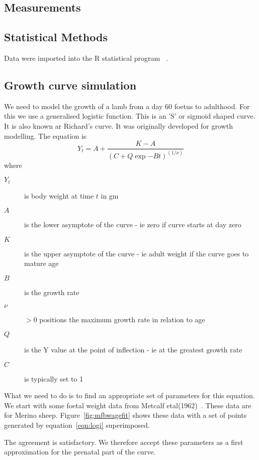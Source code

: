 \documentclass[titlepage]{article}  %
\begin{document}
\subsection{Measurements}


\subsection{Statistical Methods}
Data were imported into the R statistical program~\cite{rprog:13} .

\subsection{Growth curve simulation}
\label{sec:growth}
We need to model the growth of a lamb from a day 60 foetus to adulthood. 
For this we use a generalised logistic function. This is an 'S' or sigmoid shaped curve. It is also known ar Richard's curve. It was originally developed for growth modelling. The equation is
\begin{equation}
\label{eqn:logi}
Y_{t} = A + \frac{K - A}{(C + Q \exp{-B t})^(1/\nu)}
\end{equation}
where 
\begin{description}
\item[$Y_{t}$] is body weight at time $t$ in gm
\item[$A$] is the lower asymptote of the curve - ie zero if curve starts at day zero
\item[$K$] is the upper asymptote of the curve - ie adult weight if the curve goes to mature age
\item[$B$] is the growth rate 
\item[$\nu$] $>0$ positions the maximum growth rate in relation to age
\item[$Q$] is the Y value at the point of inflection - ie at the greatest growth rate
\item[$C$] is typically set to 1
\end{description}

What we need to do is to find an appropriate set of parameters for this equation. We start with some foetal weight data from Metcalf etal(1962)~\cite{metc:62}. These data are for Merino sheep.  Figure~\ref{fig:mfbwagefit} shows these data with a set of points generated by equation~\ref{eqn:logi} superimposed. 

The agreement is satisfactory. We therefore accept these parameters as a first approximation for the prenatal part of the curve.
\end{document}
